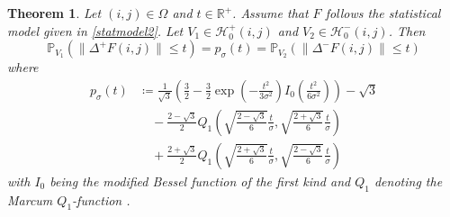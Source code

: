 \documentclass[a4paper,12pt]{article}
\newcommand{\norm}[1]{\lVert#1\rVert}
\theoremstyle{plain}
\newtheorem{theorem}{Theorem}[section]
\theoremstyle{definition}
\numberwithin{equation}{section}
\begin{document}
\begin{theorem}\label{thm: cdf}
	Let $(i, j) \in \Omega$ and $t \in \mathbb{R}^+$. Assume that $F$ follows the statistical model given in \eqref{statmodel2}. Let $V_1 \in \mathcal{H}_0^+(i, j)$ and $V_2 \in \mathcal{H}_0^-(i, j)$. Then
	\begin{equation}\label{eq: probequality}
		\mathbb{P}_{V_1}( \norm{\Delta^+ F(i, j)} \leq t ) = p_\sigma(t) = \mathbb{P}_{V_2}( \norm{\Delta^- F(i, j)} \leq t )
	\end{equation}
	where
	\begin{equation}\label{eq: cdf}
		\begin{aligned}
			p_\sigma(t) &\coloneqq \frac{1}{\sqrt{3}} \left( \frac{3}{2} - \frac{3}{2} \exp \left( - \frac{t^2}{3 \sigma^2} \right) I_0 \left( \frac{t^2}{6 \sigma^2} \right) \right) - \sqrt{3} \\
			&\quad - \frac{2 - \sqrt{3}}{2} Q_1 \left( \sqrt{\frac{2 - \sqrt{3}}{6}} \frac{t}{\sigma}, \sqrt{\frac{2 + \sqrt{3}}{6}} \frac{t}{\sigma} \right) \\
			&\quad + \frac{2 + \sqrt{3}}{2} Q_1 \left( \sqrt{\frac{2 + \sqrt{3}}{6}} \frac{t}{\sigma}, \sqrt{\frac{2 - \sqrt{3}}{6}} \frac{t}{\sigma} \right)
		\end{aligned}
	\end{equation}
	with $I_0$ being the modified Bessel function of the first kind \cite[p.~910-911]{TISP} and $Q_1$ denoting the Marcum $Q_1$-function \cite{IntQFunction}.
\end{theorem}
\end{document}

